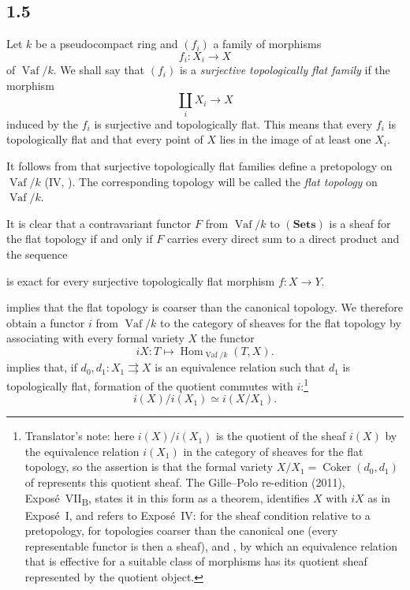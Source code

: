 
\subsection*{1.5}
\label{sga3:VIIB:1.5}

Let \(k\) be a pseudocompact ring and \((f_i)\) a family of morphisms
\[
  f_i:X_i\longrightarrow X
\]
of \(\operatorname{Vaf}/k\). We shall say that \((f_i)\) is a
\emph{surjective topologically flat family} if the morphism
\[
  \coprod_i X_i\longrightarrow X
\]
induced by the \(f_i\) is surjective and topologically flat. This
means that every \(f_i\) is topologically flat and that every point of
\(X\) lies in the image of at least one \(X_i\).

It follows from  that surjective topologically flat families
define a pretopology on \(\operatorname{Vaf}/k\) \textup{(IV,
)}. The corresponding topology will be called the \emph{flat
topology} on \(\operatorname{Vaf}/k\).

It is clear that a contravariant functor \(F\) from
\(\operatorname{Vaf}/k\) to \((\mathbf{Sets})\) is a sheaf for the flat
topology if and only if \(F\) carries every
direct sum to a direct product and the sequence
\begin{center}
  \label{sga3:VIIB:1.5:flat-sheaf-sequence}
  
\end{center}
is exact for every surjective topologically flat morphism
\(f:X\to Y\).

 implies that the flat topology is coarser than the
canonical topology. We therefore obtain a functor \(i\) from
\(\operatorname{Vaf}/k\) to the category of sheaves for the flat
topology by associating with every formal variety \(X\) the functor
\[
  iX:T\longmapsto
  \operatorname{Hom}_{\operatorname{Vaf}/k}(T,X).
\]
 implies that, if \(d_0,d_1:X_1\rightrightarrows X\) is an
equivalence relation such that \(d_1\) is topologically flat, formation
of the quotient commutes with \(i\):\footnote{Translator's note: here
\(i(X)/i(X_1)\) is the quotient of the sheaf \(i(X)\) by the equivalence
relation \(i(X_1)\) in the category of sheaves for the flat topology, so the
assertion is that the formal variety \(X/X_1=\operatorname{Coker}(d_0,d_1)\)
of  represents this quotient sheaf. The Gille--Polo re-edition (2011),
Exposé~VII\textsubscript{B}, states it in this form as a theorem, identifies \(X\)
with \(iX\) as in Exposé~I, and refers to Exposé~IV:
 for the sheaf condition relative to a pretopology,
 for topologies coarser than the canonical one (every
representable functor is then a sheaf), and , by which an
equivalence relation that is effective for a suitable class of morphisms has its
quotient sheaf represented by the quotient object.}
\[
  i(X)/i(X_1)\simeq i(X/X_1).
\]
